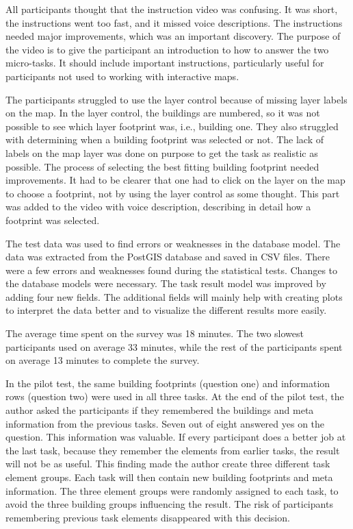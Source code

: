 All participants thought that the instruction video was confusing. It was short, the instructions went too fast, and it missed voice descriptions. The instructions needed major improvements, which was an important discovery. The purpose of the video is to give the participant an introduction to how to answer the two micro-tasks. It should include important instructions, particularly useful for participants not used to working with interactive maps. 

The participants struggled to use the layer control because of missing layer labels on the map. In the layer control, the buildings are numbered, so it was not possible to see which layer footprint was, i.e., building one. They also struggled with determining when a building footprint was selected or not. The lack of labels on the map layer was done on purpose to get the task as realistic as possible. The process of selecting the best fitting building footprint needed improvements. It had to be clearer that one had to click on the layer on the map to choose a footprint, not by using the layer control as some thought. This part was added to the video with voice description, describing in detail how a footprint was selected.

The test data was used to find errors or weaknesses in the database model. The data was extracted from the PostGIS database and saved in CSV files. There were a few errors and weaknesses found during the statistical tests. Changes to the database models were necessary. The task result model was improved by adding four new fields. The additional fields will mainly help with creating plots to interpret the data better and to visualize the different results more easily. 

The average time spent on the survey was 18 minutes. The two slowest participants used on average 33 minutes, while the rest of the participants spent on average 13 minutes to complete the survey. 

In the pilot test, the same building footprints (question one) and information rows (question two) were used in all three tasks. At the end of the pilot test, the author asked the participants if they remembered the buildings and meta information from the previous tasks. Seven out of eight answered yes on the question. This information was valuable. If every participant does a better job at the last task, because they remember the elements from earlier tasks, the result will not be as useful. This finding made the author create three different task element groups. Each task will then contain new building footprints and meta information. The three element groups were randomly assigned to each task, to avoid the three building groups influencing the result. The risk of participants remembering previous task elements disappeared with this decision. 


